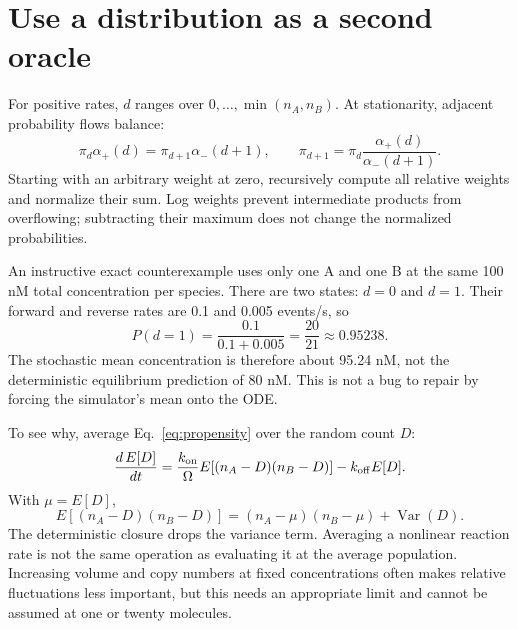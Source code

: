 \section{Use a distribution as a second oracle}

For positive rates, $d$ ranges over $0,\ldots,\min(n_A,n_B)$.
At stationarity, adjacent probability flows balance:
\begin{equation}
 \pi_d\alpha_+(d)=\pi_{d+1}\alpha_-(d+1),\qquad
 \pi_{d+1}=\pi_d\frac{\alpha_+(d)}{\alpha_-(d+1)}.
 \label{eq:stationary}
\end{equation}
Starting with an arbitrary weight at zero, recursively compute all
relative weights and normalize their sum. Log weights prevent intermediate
products from overflowing; subtracting their maximum does not change the
normalized probabilities.


An instructive exact counterexample uses only one A and one B at the
same 100 nM total concentration per species. There are two states:
$d=0$ and $d=1$. Their forward and reverse rates are 0.1 and 0.005
events/s, so
\begin{equation}
 P(d=1)=\frac{0.1}{0.1+0.005}=\frac{20}{21}\approx0.95238.
\end{equation}
The stochastic mean concentration is therefore about 95.24 nM,
not the deterministic equilibrium prediction of 80 nM. This is not
a bug to repair by forcing the simulator's mean onto the ODE.

To see why, average Eq.~\ref{eq:propensity} over the random count $D$:
\begin{equation}
 \frac{d\,E[D]}{dt}=
 \frac{k_{\rm on}}{\Omega}E[(n_A-D)(n_B-D)]-k_{\rm off}E[D].
\end{equation}
With $\mu=E[D]$,
\begin{equation}
 E[(n_A-D)(n_B-D)]=(n_A-\mu)(n_B-\mu)+\operatorname{Var}(D).
\end{equation}
The deterministic closure drops the variance term. Averaging a nonlinear
reaction rate is not the same operation as evaluating it at the average
population. Increasing volume and copy numbers at fixed concentrations
often makes relative fluctuations less important, but this needs an
appropriate limit and cannot be assumed at one or twenty molecules.

